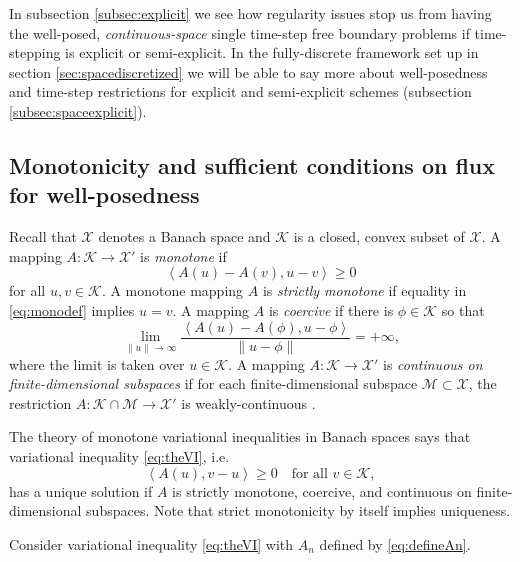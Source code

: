\documentclass[final,leqno,onefignum,onetabnum]{siamltex1213bueler}
\newcommand{\ip}[2]{\ensuremath{\left<#1,#2\right>}}
\begin{document}
In subsection \ref{subsec:explicit} we see how regularity issues stop us from having the well-posed, \emph{continuous-space} single time-step free boundary problems if time-stepping is explicit or semi-explicit.  In the fully-discrete framework set up in section \ref{sec:spacediscretized} we will be able to say more about well-posedness and time-step restrictions for explicit and semi-explicit schemes (subsection \ref{subsec:spaceexplicit}).

\subsection{Monotonicity and sufficient conditions on flux for well-posedness} \label{subsec:mono}  Recall that $\mathcal{X}$ denotes a Banach space and $\mathcal{K}$ is a closed, convex subset of $\mathcal{X}$.  A mapping $A : \mathcal{K} \to \mathcal{X}'$ is \emph{monotone} \cite{KinderlehrerStampacchia1980} if
\begin{equation}
   \ip{A(u) - A(v)}{u-v} \ge 0  \label{eq:monodef}
\end{equation}
for all $u,v\in\mathcal{K}$.  A monotone mapping $A$ is \emph{strictly monotone} if equality in \eqref{eq:monodef} implies $u=v$.  A mapping $A$ is \emph{coercive} \cite{KinderlehrerStampacchia1980} if there is $\phi\in \mathcal{K}$ so that
\begin{equation}
   \lim_{\|u\|\to\infty} \frac{\ip{A(u) - A(\phi)}{u-\phi}}{\|u-\phi\|} = +\infty, \label{eq:coercivedef}
\end{equation}
where the limit is taken over $u\in\mathcal{K}$.  A mapping $A : \mathcal{K} \to \mathcal{X}'$ is \emph{continuous on finite-dimensional subspaces} if for each finite-dimensional subspace $\mathcal{M} \subset \mathcal{X}$, the restriction $A : \mathcal{K}\cap \mathcal{M} \to \mathcal{X}'$ is weakly-continuous \cite{KinderlehrerStampacchia1980}.

The theory of monotone variational inequalities in Banach spaces \cite[chapter III]{KinderlehrerStampacchia1980} says that variational inequality \eqref{eq:theVI}, i.e.
\begin{equation}
    \ip{A(u)}{v-u} \ge 0 \quad \text{for all $v\in\mathcal{K}$}, \label{eq:VIabstract}
\end{equation}
has a unique solution if $A$ is strictly monotone, coercive, and continuous on finite-dimensional subspaces.  Note that strict monotonicity by itself implies uniqueness.

Consider variational inequality \eqref{eq:theVI} with $A_n$ defined by \eqref{eq:defineAn}.
\end{document}
